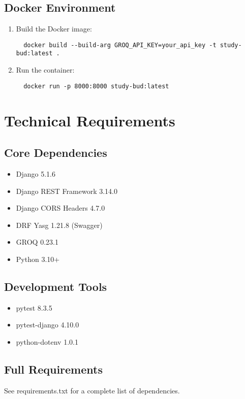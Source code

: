 \documentclass[11pt]{article}
\begin{document}
\subsection{Docker Environment}
\begin{enumerate}
  \item Build the Docker image:
  \begin{verbatim}
  docker build --build-arg GROQ_API_KEY=your_api_key -t study-bud:latest .
  \end{verbatim}
  \item Run the container:
  \begin{verbatim}
  docker run -p 8000:8000 study-bud:latest
  \end{verbatim}
\end{enumerate}

\section{Technical Requirements}

\subsection{Core Dependencies}
\begin{itemize}
  \item Django 5.1.6
  \item Django REST Framework 3.14.0
  \item Django CORS Headers 4.7.0
  \item DRF Yasg 1.21.8 (Swagger)
  \item GROQ 0.23.1
  \item Python 3.10+
\end{itemize}

\subsection{Development Tools}
\begin{itemize}
  \item pytest 8.3.5
  \item pytest-django 4.10.0
  \item python-dotenv 1.0.1
\end{itemize}

\subsection{Full Requirements}
See requirements.txt for a complete list of dependencies.
\end{document}
